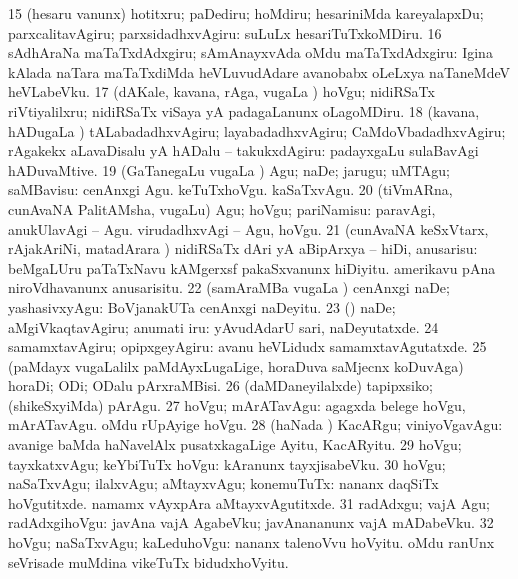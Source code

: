 {{\num{15} (hesaru \mo vanunx)
hotitxru; paDediru; hoMdiru; hesariniMda kareyalapxDu; parxcalitavAgiru;
parxsidadhxvAgiru:  suLuLx hesariTuTxkoMDiru. 
\num{16} sAdhAraNa maTaTxdAdxgiru; sAmAnayxvAda oMdu maTaTxdAdxgiru:  Igina kAlada naTara maTaTxdiMda heVLuvudAdare avanobabx oLeLxya naTaneMdeV heVLabeVku. 
\num{17} (dAKale, kavana, rAga, \mo vugaLa \vi)
hoVgu; nidiRSaTx riVtiyalilxru; nidiRSaTx viSaya yA padagaLanunx oLagoMDiru.
\num{18} (kavana, hADugaLa \vi) tALabadadhxvAgiru; layabadadhxvAgiru;
CaMdoVbadadhxvAgiru; rAgakekx aLavaDisalu yA hADalu -- takukxdAgiru:  padayxgaLu sulaBavAgi hADuvaMtive. 
\num{19} (GaTanegaLu
\mo vugaLa \vi) Agu; naDe; jarugu; uMTAgu; saMBavisu:  cenAnxgi Agu.
 keTuTxhoVgu.  kaSaTxvAgu. 
\num{20} (tiVmARna,
cunAvaNA PalitAMsha, \mo vugaLu) Agu; hoVgu; pariNamisu:  paravAgi,
anukUlavAgi -- Agu.  virudadhxvAgi -- Agu, hoVgu. 
\num{21} (cunAvaNA
keSxVtarx, rAjakAriNi, matadArara \vi) nidiRSaTx dAri yA aBipArxya -- hiDi,
anusarisu:  beMgaLUru paTaTxNavu kAMgerxsf pakaSxvanunx hiDiyitu.  amerikavu pAna niroVdhavanunx anusarisitu.
\num{22} (samAraMBa \mo vugaLa \vi) cenAnxgi naDe; yashasivxyAgu:
 BoVjanakUTa cenAnxgi naDeyitu. 
\num{23} (\AmA) naDe; aMgiVkaqtavAgiru; anumati iru:  yAvudAdarU sari, naDeyutatxde. 
\num{24} samamxtavAgiru; opipxgeyAgiru: 
avanu heVLidudx samamxtavAgutatxde. 
\num{25} (paMdayx \mo vugaLalilx paMdAyxLugaLige, horaDuva saMjecnx koDuvAga) horaDi; ODi; ODalu pArxraMBisi. 
\num{26} (daMDaneyilalxde) tapipxsiko; (shikeSxyiMda) pArAgu. 
\num{27} hoVgu; mArATavAgu:
 agagxda belege hoVgu, mArATavAgu.  oMdu
rUpAyige hoVgu. 
\num{28} (haNada \vi) KacARgu; viniyoVgavAgu:  avanige baMda haNavelAlx pusatxkagaLige
Ayitu, KacARyitu. 
\num{29} hoVgu; tayxkatxvAgu; keYbiTuTx hoVgu:
 kAranunx tayxjisabeVku. 
\num{30} hoVgu; naSaTxvAgu;
ilalxvAgu; aMtayxvAgu; konemuTuTx:  nananx
daqSiTx hoVgutitxde.  namamx vAyxpAra aMtayxvAgutitxde. 
\num{31} radAdxgu;
vajA Agu; radAdxgihoVgu:  javAna vajA AgabeVku; javAnananunx
vajA mADabeVku. 
\num{32} hoVgu; naSaTxvAgu; kaLeduhoVgu:  nananx talenoVvu hoVyitu.  oMdu ranUnx seVrisade muMdina vikeTuTx bidudxhoVyitu. 
}}
